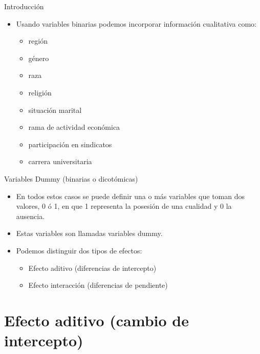 \documentclass{beamer}
\begin{document}
\begin{frame}{Introducción}
    \begin{itemize}

        \item Usando variables binarias podemos incorporar información cualitativa como:
        \begin{itemize}
            \item región
            \item género
            \item raza
            \item religión
            \item situación marital
            \item rama de actividad económica
            \item participación en sindicatos
            \item carrera universitaria
        \end{itemize}

    \end{itemize}
\end{frame}
\begin{frame}{Variables Dummy (binarias o dicotómicas)}
    \begin{itemize}
        \item En todos estos casos se puede definir una o más variables que toman dos valores, 0 ó 1, en que 1 representa la posesión de una cualidad y 0 la ausencia.
        \item Estas variables son llamadas variables dummy.
        \pause
        \item Podemos distinguir dos tipos de efectos:
        \begin{itemize}
            \item Efecto aditivo (diferencias de intercepto)
            \item Efecto interacción (diferencias de pendiente)
        \end{itemize}
    \end{itemize}
\end{frame}

\section{Efecto aditivo (cambio de intercepto)}
\end{document}
